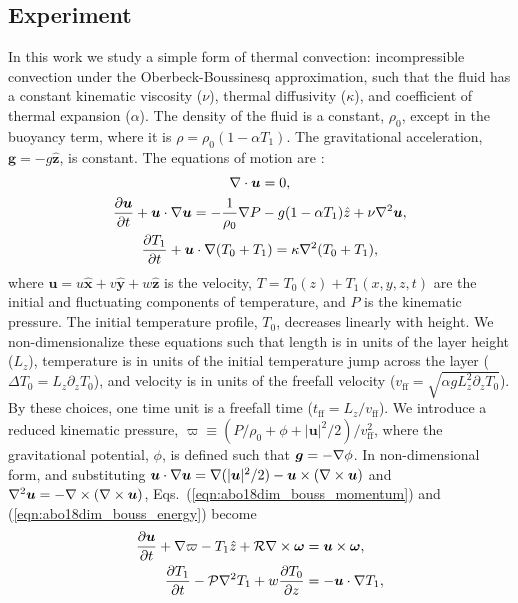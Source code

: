 \subsection{Experiment}
\label{sec:abo18_experiment}
In this work we study a simple form of thermal convection: incompressible \RB convection under the Oberbeck-Boussinesq approximation, such that the fluid has a constant kinematic viscosity ($\nu$), thermal diffusivity ($\kappa$), and coefficient of thermal expansion ($\alpha$). 
The density of the fluid is a constant, $\rho_0$, except in the buoyancy term, where it is $\rho = \rho_0(1  - \alpha T_1)$.
The gravitational acceleration, $\bm{g} = - g\bm{\hat{z}}$, is constant.
The equations of motion are \citep{spiegel&veronis1960}:
\begin{gather}
\nabla\cdot\bm{u} = 0, 
	\label{eqn:abo18incompressible}
\\
\frac{\partial \bm{u}}{\partial t} + \bm{u}\cdot\nabla\bm{u} =
-\frac{1}{\rho_0}\nabla P - g( 1 - \alpha T_1)\hat{z} + \nu\nabla^2\bm{u}, 
	\label{eqn:abo18dim_bouss_momentum}
\\
\frac{\partial T_1}{\partial t} + \bm{u}\cdot\nabla(T_0 + T_1) = \kappa\nabla^2 (T_0 + T_1),
	\label{eqn:abo18dim_bouss_energy}
\end{gather}
where $\bm{u} = u\bm{\hat{x}} + v\bm{\hat{y}} + w\bm{\hat{z}}$ is the velocity, $T = T_0(z) + T_1(x, y, z, t)$ are the initial and fluctuating components of temperature, and $P$ is the kinematic pressure. 
The initial temperature profile, $T_0$, decreases linearly with height.
We non-dimensionalize these equations such that length is in units of the layer height ($L_z$), temperature is in units of the initial temperature jump across the layer ($\Delta T_0 = L_z \partial_z T_0$), and velocity is in units of the freefall velocity ($v_{\text{ff}} = \sqrt{\alpha g L_z^2 \partial_z T_0}$).
By these choices, one time unit is a freefall time ($t_{\text{ff}} = L_z/v_{\text{ff}}$).
We introduce a reduced kinematic pressure, $\varpi \equiv (P / \rho_0 + \phi + |\bm{u}|^2 / 2) / v_{\text{ff}}^2$, where the gravitational potential, $\phi$, is defined such that $\bm{g} = -\nabla \phi$. 
In non-dimensional form, and substituting $\bm{u}\cdot\nabla\bm{u} = \nabla(|\bm{u}|^2/2) - \bm{u}\times(\nabla\times\bm{u})$ and $\nabla^2\bm{u} = -\nabla\times(\nabla\times\bm{u})$, Eqs.~(\ref{eqn:abo18dim_bouss_momentum}) and (\ref{eqn:abo18dim_bouss_energy}) become 
\begin{align}
\frac{\partial \bm{u}}{\partial t} + \nabla \varpi - T_1\hat{z} + \mathcal{R}\nabla\times\bm{\omega} &= \bm{u}\times\bm{\omega},
	\label{eqn:abo18bouss_momentum}
\\
\frac{\partial T_1}{\partial t} - \mathcal{P}\nabla^2 T_1 + w \frac{\partial T_0}{\partial z} &= - \bm{u}\cdot\nabla T_1,
	\label{eqn:abo18bouss_energy}
\end{align}
